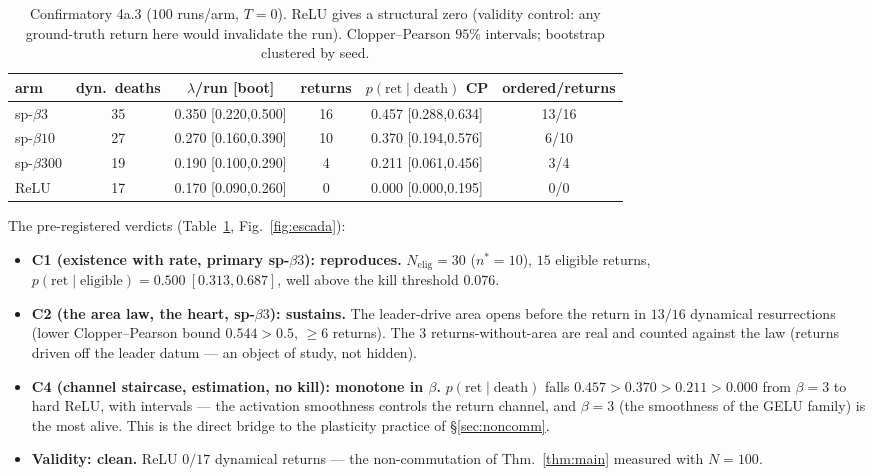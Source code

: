 \documentclass[11pt]{article}
\begin{document}
\begin{table}[t]
\centering
\small
\begin{tabular}{lccccc}
\toprule
arm & dyn.\ deaths & $\lambda$/run [boot] & returns & $p(\mathrm{ret}\mid\mathrm{death})$ CP & ordered/returns \\
\midrule
sp-$\beta3$   & 35 & 0.350 [0.220,0.500] & 16 & 0.457 [0.288,0.634] & 13/16 \\
sp-$\beta10$  & 27 & 0.270 [0.160,0.390] & 10 & 0.370 [0.194,0.576] & 6/10 \\
sp-$\beta300$ & 19 & 0.190 [0.100,0.290] & 4  & 0.211 [0.061,0.456] & 3/4 \\
ReLU          & 17 & 0.170 [0.090,0.260] & 0  & 0.000 [0.000,0.195] & 0/0 \\
\bottomrule
\end{tabular}
\caption{Confirmatory 4a.3 ($100$ runs/arm, $T=0$). ReLU gives a structural zero
(validity control: any ground-truth return here would invalidate the run).
Clopper--Pearson $95\%$ intervals; bootstrap clustered by seed.}
\label{tab:4a3}
\end{table}

The pre-registered verdicts (Table~\ref{tab:4a3}, Fig.~\ref{fig:escada}):
\begin{itemize}
\item \textbf{C1 (existence with rate, primary sp-$\beta3$): reproduces.}
$N_{\mathrm{elig}}=30$ ($n^\ast=10$), $15$ eligible returns,
$p(\mathrm{ret}\mid\mathrm{eligible})=0.500\ [0.313,0.687]$, well above the kill
threshold $0.076$.
\item \textbf{C2 (the area law, the heart, sp-$\beta3$): sustains.} The
leader-drive area opens before the return in $13/16$ dynamical resurrections
(lower Clopper--Pearson bound $0.544>0.5$, $\ge6$ returns). The $3$
returns-without-area are real and counted against the law (returns driven off the
leader datum --- an object of study, not hidden).
\item \textbf{C4 (channel staircase, estimation, no kill): monotone in $\beta$.}
$p(\mathrm{ret}\mid\mathrm{death})$ falls $0.457>0.370>0.211>0.000$ from
$\beta=3$ to hard ReLU, with intervals --- the activation smoothness controls the
return channel, and $\beta=3$ (the smoothness of the GELU family) is the most
alive. This is the direct bridge to the plasticity practice of
\S\ref{sec:noncomm}.
\item \textbf{Validity: clean.} ReLU $0/17$ dynamical returns --- the
non-commutation of Thm.~\ref{thm:main} measured with $N=100$.
\end{itemize}
\end{document}
